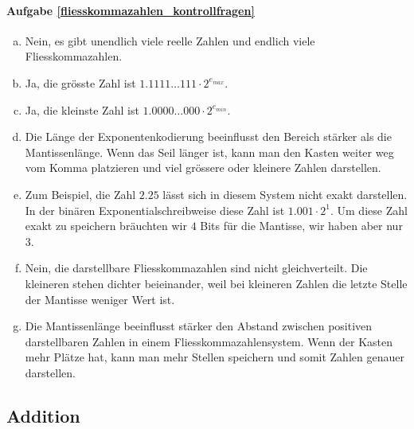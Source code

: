 \paragraph{Aufgabe \ref{fliesskommazahlen_kontrollfragen}}
\begin{enumerate}[(a)]
\item Nein, es gibt unendlich viele reelle Zahlen und endlich viele Fliesskommazahlen.
\item Ja, die grösste Zahl ist \(1.1111 \ldots 111 \cdot 2^{e_{max}}\).
\item Ja, die kleinste Zahl ist \(1.0000 \ldots 000 \cdot 2^{e_{min}}\).
\item Die Länge der Exponentenkodierung beeinflusst den Bereich stärker als die Mantissenlänge. Wenn das Seil länger ist, kann man den Kasten weiter weg vom Komma platzieren und viel grössere oder kleinere Zahlen darstellen.
\item Zum Beispiel, die Zahl \(2.25\) lässt sich in diesem System nicht exakt darstellen. In der binären Exponentialschreibweise diese Zahl ist \(1.001 \cdot 2^{1}\). Um diese Zahl exakt zu speichern bräuchten wir \(4\) Bits für die Mantisse, wir haben aber nur \(3\).
\item Nein, die darstellbare Fliesskommazahlen sind nicht gleichverteilt. Die kleineren stehen dichter beieinander, weil bei kleineren Zahlen die letzte Stelle der Mantisse weniger Wert ist.
\item Die Mantissenlänge beeinflusst stärker den Abstand zwischen positiven darstellbaren Zahlen in einem Fliesskommazahlensystem. Wenn der Kasten mehr Plätze hat, kann man mehr Stellen speichern und somit Zahlen genauer darstellen.
\end{enumerate}


\subsection{Addition}
